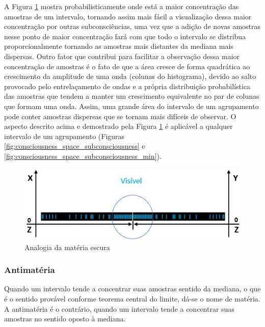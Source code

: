 A Figura \ref{fig:consciousness_dark_matter_dark_energy_wave} mostra probabilisticamente onde está a maior concentração das amostras de um intervalo, tornando assim mais fácil a visualização dessa maior concentração por outras subconsciências, uma vez que a adição de novas amostras nesse ponto de maior concentração fará com que todo o intervalo se distribua proporcionalmente tornando as amostras mais distantes da mediana mais dispersas. Outro fator que contribui para facilitar a observação dessa maior concentração de amostras é o fato de que a área cresce de forma quadrática ao crescimento da amplitude de uma onda (colunas do histograma), devido ao salto provocado pelo entrelaçamento de ondas e a própria distribuição probabilística das amostras que tendem a manter um crescimento equivalente no par de colunas que formam uma onda. Assim, uma grande área do intervalo de um agrupamento pode conter amostras dispersas que se tornam mais difíceis de observar. O aspecto descrito acima e demostrado pela Figura \ref{fig:consciousness_dark_matter_dark_energy_wave} é aplicável a qualquer intervalo de um agrupamento (Figuras \ref{fig:consciousness_space_subconsciousness} e \ref{fig:consciousness_space_subconsciousness_min}).
	\begin{figure}[H]
	\caption{Analogia da matéria escura}
	\label{fig:consciousness_dark_matter_dark_energy_wave}
	\centering
	\includegraphics[scale=.85]{sections/images/consciousness_dark_matter_dark_energy_wave.jpg}
	\end{figure}

\subsubsection{Antimatéria}
Quando um intervalo tende a concentrar suas amostras sentido da mediana, o que é o sentido provável conforme teorema central do limite, dá-se o nome de matéria. A antimatéria é o contrário, quando um intervalo tende a concentrar suas amostras no sentido oposto à mediana. 

